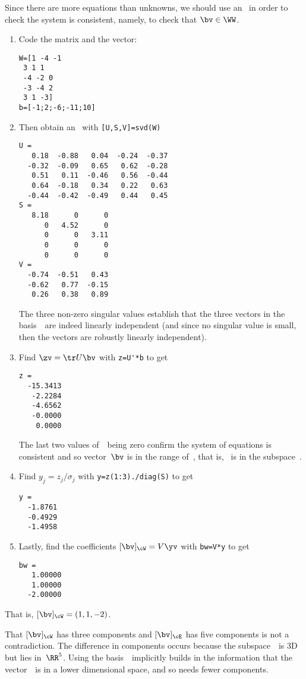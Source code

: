 \begin{example}
\begin{enumerate}
\begin{solution}
Since there are more equations than unknowns, we should use an \svd\ in order to check the system is consistent, namely, to check that \(\bv\in\WW\).
\begin{enumerate}
\item Code the matrix and the vector:
\begin{verbatim}
W=[1 -4 -1
 3 1 1
 -4 -2 0
 -3 -4 2
 3 1 -3]
b=[-1;2;-6;-11;10]
\end{verbatim}
\setbox\ajrqrbox\hbox{}%
\marginpar{\usebox{\ajrqrbox}}%
\item Then obtain an \svd\ with \verb|[U,S,V]=svd(W)| \twodp
\begin{verbatim}
U =
   0.18  -0.88   0.04  -0.24  -0.37
  -0.32  -0.09   0.65   0.62  -0.28
   0.51   0.11  -0.46   0.56  -0.44
   0.64  -0.18   0.34   0.22   0.63
  -0.44  -0.42  -0.49   0.44   0.45
S =
   8.18      0      0
      0   4.52      0
      0      0   3.11
      0      0      0
      0      0      0
V =
  -0.74  -0.51   0.43
  -0.62   0.77  -0.15
   0.26   0.38   0.89
\end{verbatim}
The three non-zero singular values establish that the three vectors in the basis~\cW\ are indeed linearly independent (and since no singular value is small, then the vectors are robustly linearly independent).

\item Find \(\zv=\tr U\bv\) with \verb|z=U'*b| to get
\begin{verbatim}
z =
  -15.3413
   -2.2284
   -4.6562
   -0.0000
    0.0000
\end{verbatim}
The last two values of~\zv\ being zero confirm the system of equations is consistent and so vector~\(\bv\) is in the range of~\cW, that is, \bv~is in the subspace~\WW.

\item Find \(y_j=z_j/\sigma_j\) with \verb|y=z(1:3)./diag(S)| to get
\begin{verbatim}
y =
  -1.8761
  -0.4929
  -1.4958
\end{verbatim}

\item Lastly, find the coefficients \([\bv]_\cW=V\yv\) with \verb|bw=V*y| to get
\begin{verbatim}
bw =
   1.00000
   1.00000
  -2.00000
\end{verbatim}
\end{enumerate}
That is, \([\bv]_\cW=(1,1,-2)\).

That \([\bv]_\cW\) has three components and \([\bv]_\cE\) has five components is not a contradiction.  
The difference in components occurs because the subspace~\WW\ is 3D but lies in~\(\RR^5\).  
Using the basis~\cW\ implicitly builds in the information that the vector~\bv\ is in a lower dimensional space, and so needs fewer components.
\end{solution}

\end{enumerate}
\end{example}





